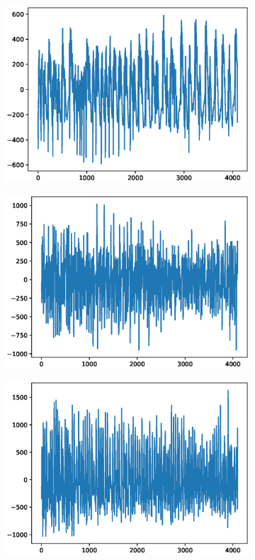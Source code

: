 \documentclass[12pt]{article}
\begin{document}
\begin{figure}
\begin{subfigure}{.25\textwidth}
  \centering
  \includegraphics[width=.8\linewidth]{figures/signals/E/S015.eps}
\end{subfigure}%
\begin{subfigure}{.25\textwidth}
  \centering
  \includegraphics[width=.8\linewidth]{figures/signals/E/S024.eps}
\end{subfigure}
\begin{subfigure}{.25\textwidth}
  \centering
  \includegraphics[width=.8\linewidth]{figures/signals/E/S028.eps}

\end{subfigure}
\end{figure}
\end{document}
